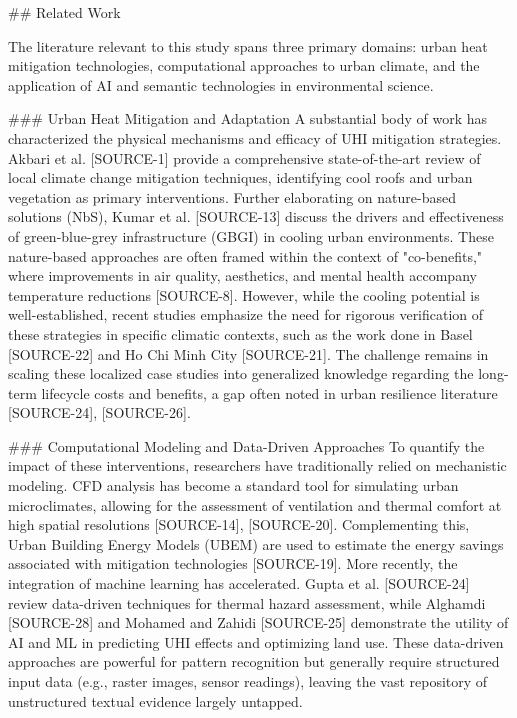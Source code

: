 \documentclass{article}
\begin{document}
\#\# Related Work

The literature relevant to this study spans three primary domains: urban heat mitigation technologies, computational approaches to urban climate, and the application of AI and semantic technologies in environmental science.

\#\#\# Urban Heat Mitigation and Adaptation
A substantial body of work has characterized the physical mechanisms and efficacy of UHI mitigation strategies. Akbari et al. [SOURCE-1] provide a comprehensive state-of-the-art review of local climate change mitigation techniques, identifying cool roofs and urban vegetation as primary interventions. Further elaborating on nature-based solutions (NbS), Kumar et al. [SOURCE-13] discuss the drivers and effectiveness of green-blue-grey infrastructure (GBGI) in cooling urban environments. These nature-based approaches are often framed within the context of "co-benefits," where improvements in air quality, aesthetics, and mental health accompany temperature reductions [SOURCE-8]. However, while the cooling potential is well-established, recent studies emphasize the need for rigorous verification of these strategies in specific climatic contexts, such as the work done in Basel [SOURCE-22] and Ho Chi Minh City [SOURCE-21]. The challenge remains in scaling these localized case studies into generalized knowledge regarding the long-term lifecycle costs and benefits, a gap often noted in urban resilience literature [SOURCE-24], [SOURCE-26].

\#\#\# Computational Modeling and Data-Driven Approaches
To quantify the impact of these interventions, researchers have traditionally relied on mechanistic modeling. CFD analysis has become a standard tool for simulating urban microclimates, allowing for the assessment of ventilation and thermal comfort at high spatial resolutions [SOURCE-14], [SOURCE-20]. Complementing this, Urban Building Energy Models (UBEM) are used to estimate the energy savings associated with mitigation technologies [SOURCE-19]. More recently, the integration of machine learning has accelerated. Gupta et al. [SOURCE-24] review data-driven techniques for thermal hazard assessment, while Alghamdi [SOURCE-28] and Mohamed and Zahidi [SOURCE-25] demonstrate the utility of AI and ML in predicting UHI effects and optimizing land use. These data-driven approaches are powerful for pattern recognition but generally require structured input data (e.g., raster images, sensor readings), leaving the vast repository of unstructured textual evidence largely untapped.
\end{document}
